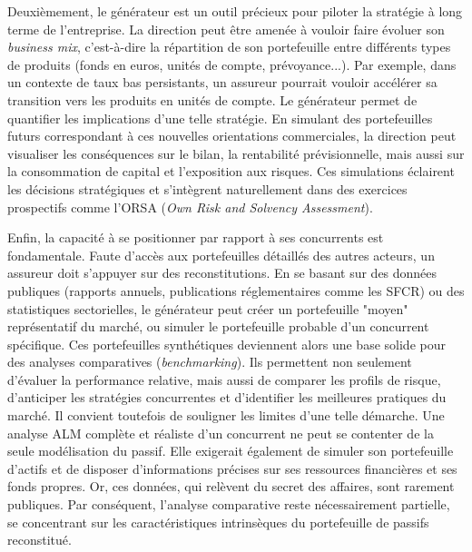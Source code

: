 Deuxièmement, le générateur est un outil précieux pour piloter la stratégie à long terme de l'entreprise. La direction peut être amenée à vouloir faire évoluer son \textit{business mix}, c'est-à-dire la répartition de son portefeuille entre différents types de produits (fonds en euros, unités de compte, prévoyance...). Par exemple, dans un contexte de taux bas persistants, un assureur pourrait vouloir accélérer sa transition vers les produits en unités de compte. Le générateur permet de quantifier les implications d'une telle stratégie. En simulant des portefeuilles futurs correspondant à ces nouvelles orientations commerciales, la direction peut visualiser les conséquences sur le bilan, la rentabilité prévisionnelle, mais aussi sur la consommation de capital et l'exposition aux risques. Ces simulations éclairent les décisions stratégiques et s'intègrent naturellement dans des exercices prospectifs comme l'ORSA (\textit{Own Risk and Solvency Assessment}).

Enfin, la capacité à se positionner par rapport à ses concurrents est fondamentale. Faute d'accès aux portefeuilles détaillés des autres acteurs, un assureur doit s'appuyer sur des reconstitutions. En se basant sur des données publiques (rapports annuels, publications réglementaires comme les SFCR) ou des statistiques sectorielles, le générateur peut créer un portefeuille "moyen" représentatif du marché, ou simuler le portefeuille probable d'un concurrent spécifique. Ces portefeuilles synthétiques deviennent alors une base solide pour des analyses comparatives (\textit{benchmarking}). Ils permettent non seulement d'évaluer la performance relative, mais aussi de comparer les profils de risque, d'anticiper les stratégies concurrentes et d'identifier les meilleures pratiques du marché. Il convient toutefois de souligner les limites d'une telle démarche. Une analyse ALM complète et réaliste d'un concurrent ne peut se contenter de la seule modélisation du passif. Elle exigerait également de simuler son portefeuille d'actifs et de disposer d'informations précises sur ses ressources financières et ses fonds propres. Or, ces données, qui relèvent du secret des affaires, sont rarement publiques. Par conséquent, l'analyse comparative reste nécessairement partielle, se concentrant sur les caractéristiques intrinsèques du portefeuille de passifs reconstitué.
\bigskip

